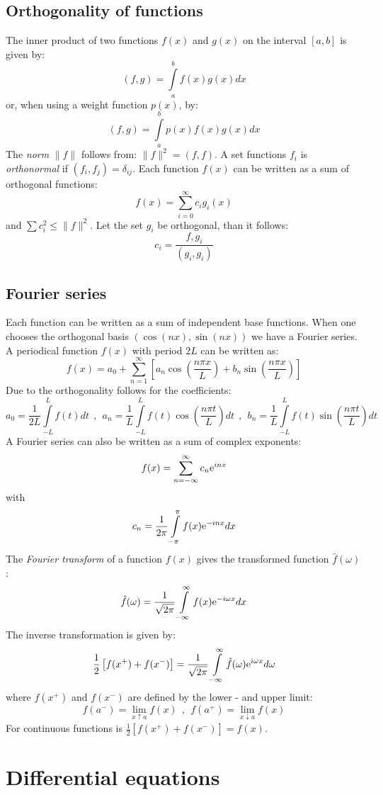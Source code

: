 \documentclass[twoside]{report}
\begin{document}
\section{Orthogonality of functions}
The inner product of two functions $f(x)$ and $g(x)$ on the interval $[a,b]$
is given by:
\[
(f,g)=\int\limits_a^bf(x)g(x)dx
\]
or, when using a weight function $p(x)$, by:
\[
(f,g)=\int\limits_a^bp(x)f(x)g(x)dx
\]
The {\it norm} $\|f\|$ follows from: $\|f\|^2=(f,f)$. A set functions $f_i$
is {\it orthonormal} if $(f_i,f_j)=\delta_{ij}$.
\npar
Each function $f(x)$ can be written as a sum of orthogonal functions:
\[
f(x)=\sum_{i=0}^\infty c_ig_i(x)
\]
and $\sum c_i^2\leq\|f\|^2$. Let the set $g_i$ be orthogonal, than it follows:
\[
c_i=\frac{f,g_i}{(g_i,g_i)}
\]

\section{Fourier series}
Each function can be written as a sum of independent base functions. When one
chooses the orthogonal basis $(\cos(nx),\sin(nx))$ we have a Fourier series.
\npar
A periodical function $f(x)$ with period $2L$ can be written as:
\[
f(x)=a_0+\sum_{n=1}^\infty\left[a_n\cos\left(\frac{n\pi x}{L}\right)+b_n\sin\left(\frac{n\pi x}{L}\right)\right]
\]
Due to the orthogonality follows for the coefficients:
\[
a_0=\frac{1}{2L}\int\limits_{-L}^Lf(t)dt~~,~~
a_n=\frac{1}{L}\int\limits_{-L}^Lf(t)\cos\left(\frac{n\pi t}{L}\right)dt~~,~~
b_n=\frac{1}{L}\int\limits_{-L}^Lf(t)\sin\left(\frac{n\pi t}{L}\right)dt
\]
A Fourier series can also be written as a sum of complex exponents:
\[
f(x)=\sum_{n=-\infty}^\infty c_n{\rm e}^{inx}
\]
with
\[
c_n=\frac{1}{2\pi}\int\limits_{-\pi}^\pi f(x){\rm e}^{-inx}dx
\]
The {\it Fourier transform} of a function $f(x)$ gives the transformed function
$\hat{f}(\omega)$:
\[
\hat{f}(\omega)=\frac{1}{\sqrt{2\pi}}\int\limits_{-\infty}^\infty f(x){\rm e}^{-i\omega x}dx
\]
The inverse transformation is given by:
\[
\frac{1}{2}\left[f(x^+)+f(x^-)\right]=\frac{1}{\sqrt{2\pi}}\int\limits_{-\infty}^\infty\hat{f}(\omega){\rm e}^{i\omega x}d\omega
\]
where $f(x^+)$ and $f(x^-)$ are defined by the lower - and upper limit:
\[
f(a^-)=\lim_{x\uparrow a}f(x)~~,~~f(a^+)=\lim_{x\downarrow a}f(x)
\]
For continuous functions is $\frac{1}{2}\left[f(x^+)+f(x^-)\right]=f(x)$.

\chapter{Differential equations}
\end{document}
